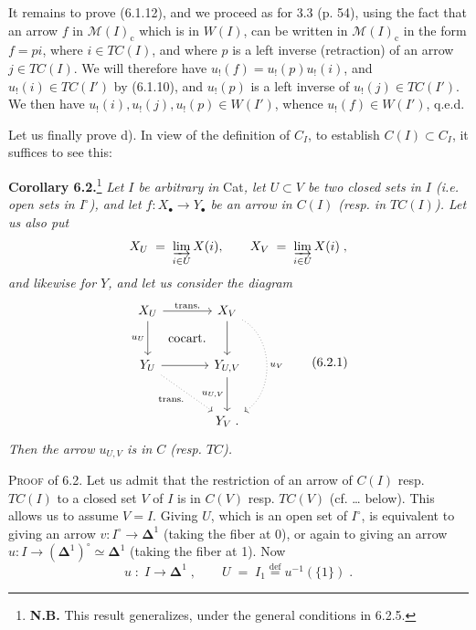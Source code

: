 \documentclass[11pt]{article}
\newcommand{\printedpage}[1]{\marginpar{\footnotesize p.~#1}}
\newcommand{\msp}[1]{\marginpar{\footnotesize [#1]}}
\newcommand{\Dl}{\boldsymbol{\Delta}}
\begin{document}
\printedpage{52}

\msp{page 104}

It remains to prove (6.1.12), and we proceed as for 3.3 (p. 54), using the fact that an arrow $f$ in $\mathcal{M}(I)_{\mathrm{c}}$ which is in $W(I)$, can be written in $\mathcal{M}(I)_{\mathrm{c}}$ in the form $f = pi$, where $i \in TC(I)$, and where $p$ is a left inverse (retraction) of an arrow $j \in TC(I)$. We will therefore have $u_!(f) = u_!(p)u_!(i)$, and $u_!(i) \in TC(I')$ by (6.1.10), and $u_!(p)$ is a left inverse of $u_!(j) \in TC(I')$. We then have $u_!(i), u_!(j), u_!(p) \in W(I')$, whence $u_!(f) \in W(I')$, q.e.d.

Let us finally prove d). In view of the definition of $C_I$, to establish $C(I) \subset C_I$, it suffices to see this:

\textbf{Corollary 6.2.}\footnote[31]{\textbf{N.B.} This result generalizes, under the general conditions in 6.2.5.} \textit{Let $I$ be arbitrary in} Cat\textit{, let $U \subset V$ be two closed sets in $I$ (i.e. open sets in $I^{\circ}$), and let $f : X_{\bullet} \longrightarrow Y_{\bullet}$ be an arrow in $C(I)$ (resp. in $TC(I)$). Let us also put}
\msp{page 105}
\[
X_U \;=\; \varinjlim_{i\in U} X(i), \qquad X_V \;=\; \varinjlim_{i\in U} X(i)\;, %
\]
\textit{and likewise for $Y$, and let us consider the diagram}
\[
\begin{tikzcd}[row sep=large, column sep=large]
X_U \arrow[r, "\text{trans.}"] \arrow[d, "u_U"'] \arrow[dr, phantom, "\text{cocart.}"] & X_V \arrow[d] \arrow[dd, dotted, bend left=60, "u_V"] \\
Y_U \arrow[r] \arrow[dr, dotted, "\text{trans.}"'] & Y_{U,V} \arrow[d, "u_{U,V}"'] \\
 & Y_V\;.
\end{tikzcd}
\tag*{(6.2.1)}
\]
\textit{Then the arrow $u_{U,V}$ is in $C$ (resp. $TC$).}

\textsc{Proof} of 6.2. Let us admit that the restriction of an arrow of $C(I)$ resp. $TC(I)$ to a closed set $V$ of $I$ is in $C(V)$ resp. $TC(V)$ (cf. \dots{} below). This allows us to assume $V = I$. Giving $U$, which is an open set of $I^{\circ}$, is equivalent to giving an arrow $v : I^{\circ} \longrightarrow \Dl^1$ (taking the fiber at 0), or again to giving an arrow $u : I \longrightarrow (\Dl^1)^{\circ} \simeq \Dl^1$ (taking the fiber at 1). Now %
\[
u \;:\; I \longrightarrow \Dl^1\;, \qquad U \;=\; I_1 \overset{\text{def}}{=} u^{-1}(\{1\})\;.
\tag*{(6.2.2)}
\]
\end{document}
